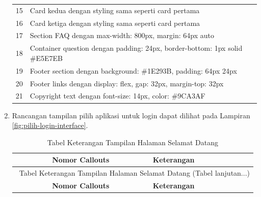 \begin{enumerate}
\begin{longtable}{c p{}}
		      15                      & Card kedua dengan styling sama seperti card pertama                                                                   \\
		      16                      & Card ketiga dengan styling sama seperti card pertama                                                                  \\
		      17                      & Section FAQ dengan max-width: 800px, margin: 64px auto                                                                \\
		      18                      & Container question dengan padding: 24px, border-bottom: 1px solid \#E5E7EB                                            \\
		      19                      & Footer section dengan background: \#1E293B, padding: 64px 24px                                                        \\
		      20                      & Footer links dengan display: flex, gap: 32px, margin-top: 32px                                                        \\
		      21                      & Copyright text dengan font-size: 14px, color: \#9CA3AF                                                                \\
		      \hline
	      \end{longtable}


	\item Rancangan tampilan pilih aplikasi untuk login dapat dilihat pada Lampiran \ref{fig:pilih-login-interface}. \selectfont


	      {

		      \begin{longtable}{c p{}}
			      \caption{Tabel Keterangan Tampilan Halaman Selamat Datang}                                                             \\
			      \hline
			      \textbf{Nomor Callouts} & \textbf{Keterangan}                                                                          \\
			      \hline
			      \endfirsthead

			      \multicolumn{2}{c}{ \thetable\ {Tabel Keterangan Tampilan Halaman Selamat Datang} \space (Tabel lanjutan...)}          \\
			      \hline
			      \textbf{Nomor Callouts} & \textbf{Keterangan}                                                                          \\
			      \hline
			      \endhead


\end{longtable}}
\end{enumerate}
